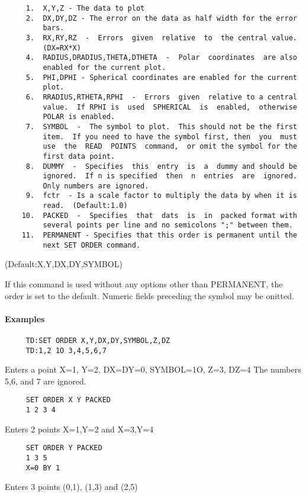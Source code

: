 \begin{verbatim}
     1.  X,Y,Z - The data to plot 
     2.  DX,DY,DZ - The error on the data as half width for the error
         bars.  
     3.  RX,RY,RZ  -  Errors  given  relative  to  the central value.
         (DX=RX*X) 
     4.  RADIUS,DRADIUS,THETA,DTHETA  -  Polar  coordinates  are also
         enabled for the current plot.  
     5.  PHI,DPHI - Spherical coordinates are enabled for the current
         plot.  
     6.  RRADIUS,RTHETA,RPHI  -  Errors  given  relative to a central
         value.  If RPHI is  used  SPHERICAL  is  enabled,  otherwise
         POLAR is enabled.  
     7.  SYMBOL  -  The symbol to plot.  This should not be the first
         item.  If you need to have the symbol first, then  you  must
         use  the  READ  POINTS  command,  or omit the symbol for the
         first data point.  
     8.  DUMMY  -  Specifies  this  entry  is  a  dummy and should be
         ignored.  If n is specified  then  n  entries  are  ignored.
         Only numbers are ignored.  
     9.  fctr  - Is a scale factor to multiply the data by when it is
         read.  (Default:1.0) 
    10.  PACKED  -  Specifies  that  dats  is  in  packed format with
         several points per line and no semicolons ";" between them. 
    11.  PERMANENT - Specifies that this order is permanent until the
         next SET ORDER command.  
\end{verbatim}

(Default:X,Y,DX,DY,SYMBOL) 

If this command is used without any options other than PERMANENT, the
order is set to the default.  Numeric fields preceding the symbol may
be onitted.  
\paragraph{Examples}
\begin{verbatim}
     TD:SET ORDER X,Y,DX,DY,SYMBOL,Z,DZ 
     TD:1,2 1O 3,4,5,6,7 
\end{verbatim}
Enters  a  point  X=1, Y=2, DX=DY=0, SYMBOL=1O, Z=3, DZ=4 The numbers
5,6, and 7 are ignored.  
\begin{verbatim}
     SET ORDER X Y PACKED 
     1 2 3 4 
\end{verbatim}
Enters 2 points X=1,Y=2 and X=3,Y=4 
\begin{verbatim}
     SET ORDER Y PACKED 
     1 3 5 
     X=0 BY 1 
\end{verbatim}
Enters 3 points (0,1), (1,3) and (2,5) 
